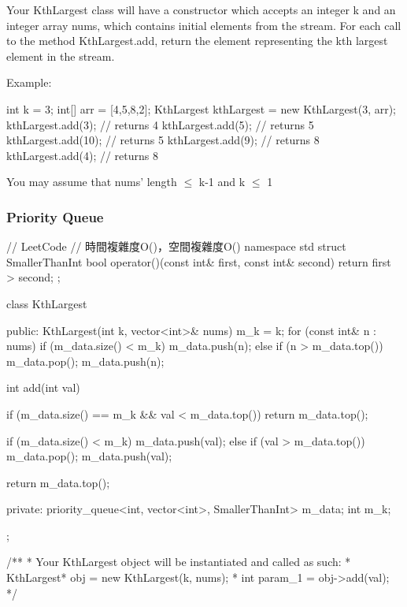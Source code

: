 Your KthLargest class will have a constructor which accepts an integer k and an integer array nums, which contains initial elements from the stream. For each call to the method KthLargest.add, return the element representing the kth largest element in the stream.

Example:
\begin{Code}
int k = 3;
int[] arr = [4,5,8,2];
KthLargest kthLargest = new KthLargest(3, arr);
kthLargest.add(3);   // returns 4
kthLargest.add(5);   // returns 5
kthLargest.add(10);  // returns 5
kthLargest.add(9);   // returns 8
kthLargest.add(4);   // returns 8
\end{Code}

You may assume that nums' length $\leq$ k-1 and k $\leq$ 1

\subsubsection{Priority Queue}
\begin{Code}
// LeetCode
// 時間複雜度O()，空間複雜度O()
namespace std {
    struct SmallerThanInt {
        bool operator()(const int& first, const int& second) {
            return first > second;
        }
    };
}

class KthLargest {
public:
    KthLargest(int k, vector<int>& nums) {
        m_k = k;
        for (const int& n : nums)
        {
            if (m_data.size() < m_k)
                m_data.push(n);
            else
            {
                if (n > m_data.top())
                {
                    m_data.pop();
                    m_data.push(n);
                }
            }
        }
    }

    int add(int val) {
        if (m_data.size() == m_k && val < m_data.top()) return m_data.top();

        if (m_data.size() < m_k)
            m_data.push(val);
        else
        {
            if (val > m_data.top())
            {
                m_data.pop();
                m_data.push(val);
            }
        }

        return m_data.top();
    }
private:
    priority_queue<int, vector<int>, SmallerThanInt> m_data;
    int m_k;
};

/**
 * Your KthLargest object will be instantiated and called as such:
 * KthLargest* obj = new KthLargest(k, nums);
 * int param_1 = obj->add(val);
 */
\end{Code}

